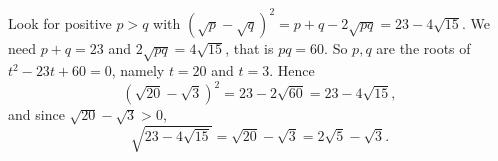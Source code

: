 Look for positive $p>q$ with $\left(\sqrt p-\sqrt q\right)^2=p+q-2\sqrt{pq}=23-4\sqrt{15}$. We need $p+q=23$ and $2\sqrt{pq}=4\sqrt{15}$, that is $pq=60$. So $p,q$ are the roots of $t^2-23t+60=0$, namely $t=20$ and $t=3$. Hence
\[
\left(\sqrt{20}-\sqrt3\right)^2=23-2\sqrt{60}=23-4\sqrt{15},
\]
and since $\sqrt{20}-\sqrt3>0$,
\[
\sqrt{23-4\sqrt{15}}=\sqrt{20}-\sqrt3=\boxed{2\sqrt5-\sqrt3} .
\]
